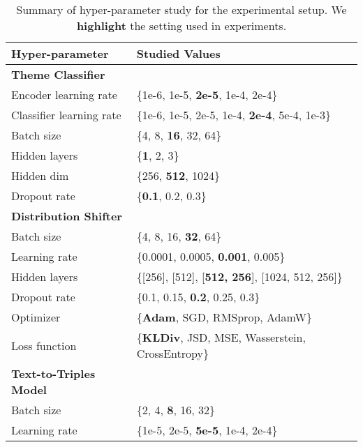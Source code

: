 \begin{table*}[!h]
\centering
\caption{Summary of hyper-parameter study for the experimental setup. We \textbf{highlight} the setting used in experiments.}
\begin{tabular}{ll}
\toprule
\textbf{Hyper-parameter} & \textbf{Studied Values} \\
\midrule
\textbf{Theme Classifier} \\
Encoder learning rate & \{1e-6, 1e-5, \textbf{2e-5}, 1e-4, 2e-4\}  \\
Classifier learning rate & \{1e-6, 1e-5, 2e-5, 1e-4, \textbf{2e-4}, 5e-4, 1e-3\}  \\
Batch size & \{4, 8, \textbf{16}, 32, 64\}\\
Hidden layers & \{\textbf{1}, 2, 3\}  \\
Hidden dim & \{256, \textbf{512}, 1024\} \\
Dropout rate & \{\textbf{0.1}, 0.2, 0.3\} \\

\midrule
\textbf{Distribution Shifter} \\
Batch size & \{4, 8, 16, \textbf{32}, 64\} \\
Learning rate & \{0.0001, 0.0005, \textbf{0.001}, 0.005\} \\
Hidden layers & \{[256], [512], [\textbf{512, 256}], [1024, 512, 256]\} \\
Dropout rate & \{0.1, 0.15, \textbf{0.2}, 0.25, 0.3\} \\
Optimizer & \{\textbf{Adam}, SGD, RMSprop, AdamW\} \\
Loss function & \{\textbf{KLDiv}, JSD, MSE, Wasserstein, CrossEntropy\} \\

\midrule
\textbf{Text-to-Triples Model} \\
Batch size & \{2, 4, \textbf{8}, 16, 32\} \\
Learning rate & \{1e-5, 2e-5, \textbf{5e-5}, 1e-4, 2e-4\} \\



\end{tabular}
\end{table*}
